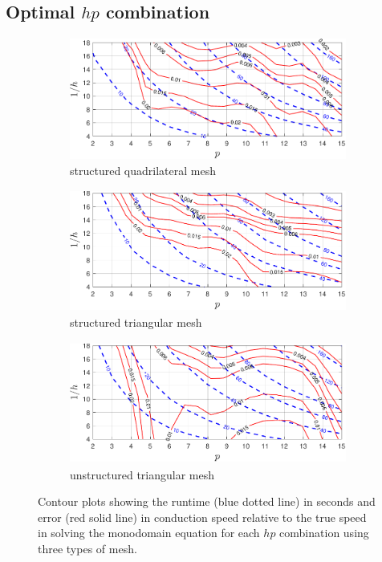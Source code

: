\subsection{Optimal $hp$ combination}
\begin{figure}[h!]
    \centering
    \begin{subfigure}[t]{0.45\textwidth}
        \centering
        \includegraphics[width=\linewidth, height=4cm]{figs/hp_str-quad.pdf}  
        \caption{structured quadrilateral mesh}
        \label{hp_str-quad}
    \end{subfigure}
    \begin{subfigure}[t]{0.45\textwidth}
        \centering
        \includegraphics[width=\linewidth, height=4cm]{figs/hp_str-tri.pdf} 
        \caption{structured triangular mesh}
        \label{hp_str-tri}
    \end{subfigure}
    \begin{subfigure}[t]{0.45\textwidth}
        \centering
        \includegraphics[width=\linewidth, height=4cm]{figs/hp_unstr-tri.pdf}  
        \caption{unstructured triangular mesh}
        \label{hp_unstr-tri}
    \end{subfigure}

    \caption{Contour plots showing the runtime (blue dotted line) in seconds and error (red solid line) in conduction speed relative to the true speed in solving the monodomain equation for each $hp$ combination using three types of mesh.}
    \label{hp}
\end{figure}


